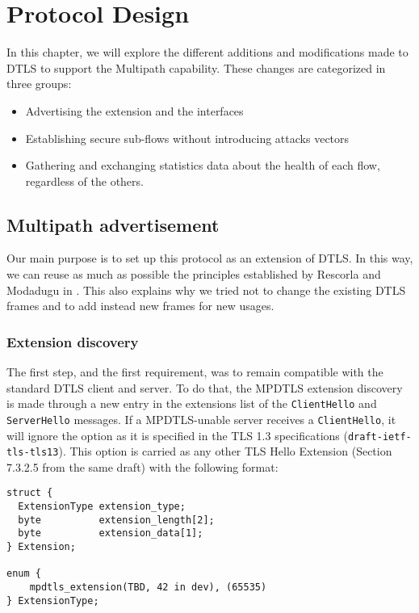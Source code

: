 \chapter{Protocol Design}\label{chap:design}

In this chapter, we will explore the different additions and modifications made to DTLS to support the Multipath capability. These changes are categorized in three groups:
\begin{itemize}
\item Advertising the extension and the interfaces
\item Establishing secure sub-flows without introducing attacks vectors
\item Gathering and exchanging statistics data about the health of each flow, regardless of the others. 
\end{itemize}


\section{Multipath advertisement}

Our main purpose is to set up this protocol as an extension of DTLS. In this way, we can reuse as much as possible the principles established by Rescorla and Modadugu in \cite{modadugu2004design}. This also explains why we tried not to change the existing DTLS frames and to add instead new frames for new usages.

\subsection{Extension discovery}\label{sec:helloext}

The first step, and the first requirement, was to remain compatible with the standard DTLS client and server. To do that, the MPDTLS extension discovery is made through a new entry in the extensions list of the \texttt{ClientHello} and \texttt{ServerHello} messages. If a MPDTLS-unable server receives a \texttt{ClientHello}, it will ignore the option as it is specified in the TLS 1.3 specifications (\texttt{draft-ietf- tls-tls13}\cite{draft-tls13}). This option is carried as any other TLS Hello Extension (Section 7.3.2.5 from the same draft) with the following format:

\begin{lstlisting}[caption=MultiPath DTLS Extension structure, label=lst:extension]
struct {
  ExtensionType extension_type;
  byte          extension_length[2];
  byte          extension_data[1];
} Extension;

enum {
    mpdtls_extension(TBD, 42 in dev), (65535)
} ExtensionType;
\end{lstlisting}

